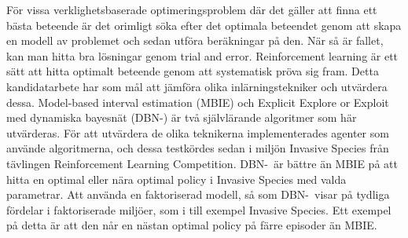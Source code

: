 För vissa verklighetsbaserade optimeringsproblem där det gäller att finna ett bästa beteende är det orimligt söka efter det optimala beteendet genom att skapa en modell av problemet och sedan utföra beräkningar på den. När så är fallet, kan man hitta bra lösningar genom trial and error. Reinforcement learning är ett sätt att hitta optimalt beteende genom att systematisk pröva sig fram.
Detta kandidatarbete har som mål att jämföra olika inlärningstekniker och utvärdera dessa.
Model-based interval estimation (MBIE) och Explicit Explore or Exploit med dynamiska bayesnät (DBN-\etre) är 
två självlärande algoritmer som här utvärderas.
För att utvärdera de olika teknikerna implementerades agenter som använde algoritmerna, och dessa testkördes sedan 
i miljön Invasive Species från tävlingen Reinforcement Learning Competition.
DBN-\etre\ är bättre än MBIE på att hitta en optimal eller nära optimal policy i Invasive Species med valda parametrar.
Att använda en faktoriserad modell, så som DBN-\etre\, visar på tydliga fördelar i faktoriserade miljöer, som i till exempel Invasive Species. 
Ett exempel på detta är att den når en nästan optimal policy på färre episoder än MBIE.
